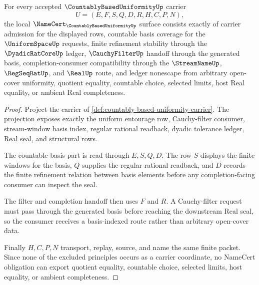 \begin{theorem}
\label{thm:countably-based-uniformity-namecert-obligations}
For every accepted $\CountablyBasedUniformityUp$ carrier
$$
U=(E,F,S,Q,D,R,H,C,P,N),
$$
the local $\NameCert_{\CountablyBasedUniformityUp}$ surface consists exactly of carrier admission for the displayed rows, countable basis coverage for the $\UniformSpaceUp$ requests, finite refinement stability through the $\DyadicRatCoreUp$ ledger, $\CauchyFilterUp$ handoff through the generated basis, completion-consumer compatibility through the $\StreamNameUp$, $\RegSeqRatUp$, and $\RealUp$ route, and ledger nonescape from arbitrary open-cover uniformity, quotient equality, countable choice, selected limits, host Real equality, or ambient Real completeness.
\end{theorem}
\begin{proof}
Project the carrier of \autoref{def:countably-based-uniformity-carrier}. The projection exposes exactly the uniform entourage row, Cauchy-filter consumer, stream-window basis index, regular rational readback, dyadic tolerance ledger, Real seal, and structural rows.

The countable-basis part is read through $E,S,Q,D$. The row $S$ displays the finite windows for the basis, $Q$ supplies the regular rational readback, and $D$ records the finite refinement relation between basis elements before any completion-facing consumer can inspect the seal.

The filter and completion handoff then uses $F$ and $R$. A Cauchy-filter request must pass through the generated basis before reaching the downstream Real seal, so the consumer receives a basis-indexed route rather than arbitrary open-cover data.

Finally $H,C,P,N$ transport, replay, source, and name the same finite packet. Since none of the excluded principles occurs as a carrier coordinate, no NameCert obligation can export quotient equality, countable choice, selected limits, host equality, or ambient completeness.
\end{proof}


